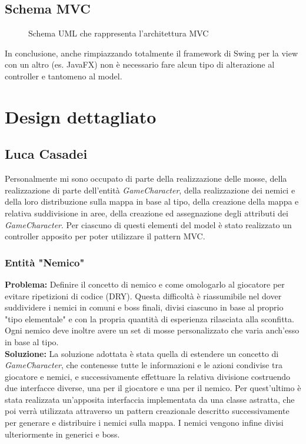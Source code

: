 \documentclass[a4paper,12pt]{report}
\begin{document}
\subsection{Schema MVC}
\begin{figure}[H]
	\centering
	
	\caption{Schema UML che rappresenta l'architettura MVC} 
	\label{fig:Schema UML che rappresenta l'architettura MVC}
\end{figure}

In conclusione, anche rimpiazzando totalmente il framework di Swing per la view con un altro (es. JavaFX) non è necessario fare alcun tipo di alterazione al controller e tantomeno al model.

\section{Design dettagliato}
\subsection{Luca Casadei}
Personalmente mi sono occupato di parte della realizzazione delle mosse, della realizzazione di parte dell'entità \textit{GameCharacter}, della realizzazione dei nemici e della loro distribuzione sulla mappa in base al tipo, della creazione della mappa e relativa suddivisione in aree, della creazione ed assegnazione degli attributi dei \textit{GameCharacter}. Per ciascuno di questi elementi del model è stato realizzato un controller apposito per poter utilizzare il pattern MVC.
\subsubsection{Entità "Nemico"}
\textbf{Problema:} Definire il concetto di nemico e come omologarlo al giocatore per evitare ripetizioni di codice (DRY).
Questa difficoltà è riassumibile nel dover suddividere i nemici in comuni e boss finali, divisi ciascuno in base al proprio "tipo elementale" e con la propria quantità di esperienza rilasciata alla sconfitta. Ogni nemico deve inoltre avere un set di mosse personalizzato che varia anch'esso in base al tipo.\\
\textbf{Soluzione:} La soluzione adottata è stata quella di estendere un concetto di \textit{GameCharacter}, che contenesse tutte le informazioni e le azioni condivise tra giocatore e nemici, e successivamente effettuare la relativa divisione costruendo due interfacce diverse, una per il giocatore e una per il nemico. Per quest'ultimo è stata realizzata un'apposita interfaccia implementata da una classe astratta, che poi verrà utilizzata attraverso un pattern creazionale descritto successivamente per generare e distribuire i nemici sulla mappa. I nemici vengono infine divisi ulteriormente in generici e boss.
\end{document}
